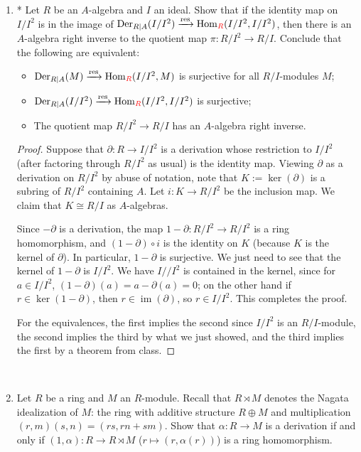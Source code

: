 \documentclass{amsart}[12pt]
\def\image{\operatorname{im}}
\def\im{\image}
\def\ker{\operatorname{ker}}
\newcommand{\Hom}{\mathrm{Hom}}
\numberwithin{equation}{section}
\theoremstyle{plain} %
\theoremstyle{definition}
\theoremstyle{remark}
\newcommand{\xra}[1]{\xrightarrow{#1}}
\newcommand{\Der}{\mathrm{Der}}
\newcommand{\red}[1]{{\color{red}#1}}
\begin{document}
\begin{enumerate}
\

\item* Let $R$ be an $A$-algebra and $I$ an ideal. Show that if the identity map on $I/I^2$ is in the image of $\Der_{R|A}(I/I^2) \xra{\mathrm{res}} \Hom_{\red{R}}(I/I^2,I/I^2)$, then there is an $A$-algebra right inverse to the quotient map $\pi:R/I^2 \to R/I$. Conclude that the following are equivalent:
\begin{itemize}
\item $\Der_{R|A}(M) \xra{\mathrm{res}} \Hom_{\red{R}}(I/I^2,M)$ is surjective for all $R/I$-modules $M$;
\item $\Der_{R|A}(I/I^2) \xra{\mathrm{res}} \Hom_{\red{R}}(I/I^2,I/I^2)$ is surjective;
\item The quotient map $R/I^2 \to R/I$ has an $A$-algebra right inverse.
\end{itemize}
\begin{proof}
Suppose that $\partial:R\to I/I^2$ is a derivation whose restriction to $I/I^2$ (after factoring through $R/I^2$ as usual) is the identity map. Viewing $\partial$ as a derivation on $R/I^2$ by abuse of notation, note that $K:=\ker(\partial)$ is a subring of $R/I^2$ containing $A$. Let $i:K\to R/I^2$ be the inclusion map. We claim that $K\cong R/I$ as $A$-algebras. 

Since $-\partial$ is a derivation, the map $1-\partial:R/I^2\to R/I^2$ is a ring homomorphism, and $(1-\partial)\circ i$ is the identity on $K$ (because $K$ is the kernel of $\partial$). In particular, $1-\partial$ is surjective. We just need to see that the kernel of $1-\partial$ is $I/I^2$. We have $I//I^2$ is contained in the kernel, since for $a\in I/I^2$, $(1-\partial)(a) =a-\partial(a) = 0$; on the other hand if $r\in \ker(1-\partial)$, then $r\in \im(\partial)$, so $r\in I/I^2$. This completes the proof.

For the equivalences, the first implies the second since $I/I^2$ is an $R/I$-module, the second implies the third by what we just showed, and the third implies the first by a theorem from class.
\end{proof}


\

\item Let $R$ be a ring and $M$ an $R$-module. Recall that $R\rtimes M$ denotes the Nagata idealization of $M$: the ring with additive structure $R\oplus M$ and multiplication $(r,m)(s,n) = (rs,rn+sm)$. Show that $\alpha:R\to M$ is a derivation if and only if $(1,\alpha):R\to R\rtimes M$ ($r\mapsto (r,\alpha(r))$) is a ring homomorphism.

\end{enumerate}
\end{document}
